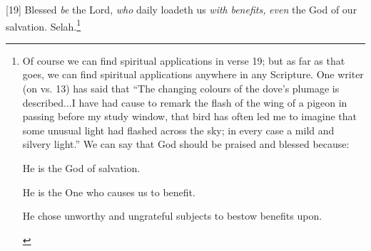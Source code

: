 [19] \textcolor[rgb]{0.00,0.00,1.00}{Blessed \emph{be} the Lord, \emph{who} daily loadeth us \emph{with} \emph{benefits,} \emph{even} the God of our salvation. Selah.}\footnote{Of course we can find spiritual applications in verse 19; but as far as that goes, we can find spiritual applications anywhere in any Scripture. One writer (on vs. 13) has said that “The changing colours of the dove’s plumage is described...I have had cause to remark the flash of the wing of a pigeon in passing before my study window, that bird has often led me to imagine that some unusual light had flashed across the sky; in every case a mild and silvery light.” We can say that God should be praised and blessed because: 
\begin{compactenum}
	\item He is the God of salvation.
	\item He is the One who causes us to benefit.
	\item He chose unworthy and ungrateful subjects to bestow benefits upon.
\end{compactenum}
}
